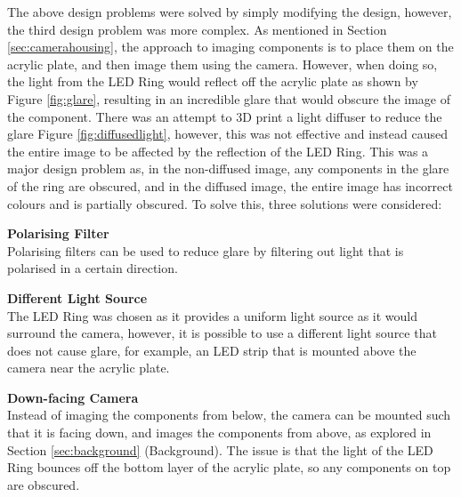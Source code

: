 The above design problems were solved by simply modifying the design, however, the third design problem was more complex. As mentioned in Section \ref*{sec:camerahousing}, the approach 
to imaging components is to place them on the acrylic plate, and then image them using the camera. However, when doing so, the light from the LED Ring would reflect off the acrylic plate as shown by Figure \ref*{fig:glare},
resulting in an incredible glare that would obscure the image of the component. There was an attempt to 3D print a light diffuser to reduce the glare Figure \ref*{fig:diffusedlight}, however, this was not effective and instead
caused the entire image to be affected by the reflection of the LED Ring. This was a major design problem as, in the non-diffused image, any components in the glare of the ring are obscured, and in the diffused image,
the entire image has incorrect colours and is partially obscured. To solve this, three solutions were considered:
\begin{mylist}
  \item \textbf{Polarising Filter} \\
  Polarising filters can be used to reduce glare by filtering out light that is polarised in a certain direction.
  \item \textbf{Different Light Source} \\
  The LED Ring was chosen as it provides a uniform light source as it would surround the camera, however, it is possible to use a different light source that does not cause glare, for example,
  an LED strip that is mounted above the camera near the acrylic plate.
  \item \textbf{Down-facing Camera} \\
  Instead of imaging the components from below, the camera can be mounted such that it is facing down, and images the components from above, as explored in Section \ref*{sec:background} (Background).
  The issue is that the light of the LED Ring bounces off the bottom layer of the acrylic plate, so any components on top are obscured.
\end{mylist}
  
